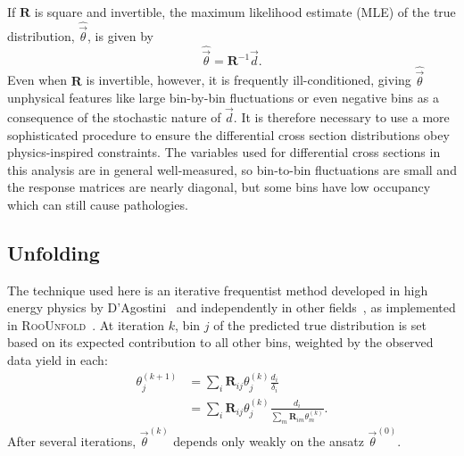 If $\mathbf{R}$ is square and invertible, the maximum likelihood estimate (MLE) of the true distribution, $\hat{\vec{\theta}}$, is given by
\begin{equation}\label{eq:unfoldingMLE}
  \hat{\vec{\theta}} = \mathbf{R}^{-1}\vec{d}.
\end{equation}
Even when $\mathbf{R}$ is invertible, however, it is frequently ill-conditioned, giving $\hat{\vec{\theta}}$ unphysical features like large bin-by-bin fluctuations or even negative bins as a consequence of the stochastic nature of $\vec{d}$.
It is therefore necessary to use a more sophisticated procedure to ensure the differential cross section distributions obey physics-inspired constraints.
The variables used for differential cross sections in this analysis are in general well-measured, so bin-to-bin fluctuations are small and the response matrices are nearly diagonal, but some bins have low occupancy which can still cause pathologies.

\subsection{Unfolding}\label{sec:unfolding}

The technique used here is an iterative frequentist method developed in high energy physics by D'Agostini~\cite{DAgostini:1994fjx} and independently in other fields~\cite{Dempster:10.2307/2984875,Lucy:1974AJ,Richardson:72,Shepp:4307558}, as implemented in \textsc{RooUnfold}~\cite{Adye:2011gm}.
At iteration $k$, bin $j$ of the predicted true distribution is set based on its expected contribution to all other bins, weighted by the observed data yield in each:
\begin{equation}
  \begin{split}
    \theta_j^{(k+1)} & = \sum_i \mathbf{R}_{ij} \theta_j^{(k)} \frac{d_i}{\delta_i} \\
    & = \sum_i \mathbf{R}_{ij} \theta_j^{(k)} \frac{d_i}{\sum_m \mathbf{R}_{im} \theta_m^{(k)}}.
  \end{split}
\end{equation}
After several iterations, $\vec{\theta}^{(k)}$ depends only weakly on the ansatz $\vec{\theta}^{(0)}$.


